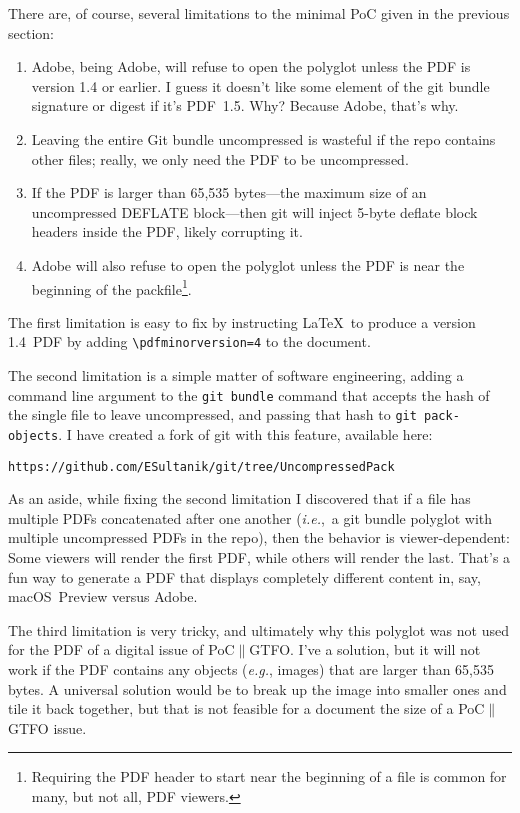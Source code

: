 \documentclass{article}
\begin{document}
There are, of course, several limitations to the minimal PoC given in
the previous section:
\begin{enumerate}

\item Adobe, being Adobe, will refuse to open the polyglot unless the PDF is version 1.4 or earlier.  I guess it doesn't like some element of the git bundle signature or digest if it's PDF~1.5. Why? Because Adobe, that's why.

\item Leaving the entire Git bundle uncompressed is wasteful if the repo contains other files; really, we only need the PDF to be uncompressed.

\item If the PDF is larger than 65,535 bytes---the maximum size of an uncompressed DEFLATE block---then git will inject 5-byte deflate block headers inside the PDF, likely corrupting it.

\item Adobe will also refuse to open the polyglot unless the PDF is near the beginning of the packfile\footnote{Requiring the PDF header to start near the beginning of a file is common for many, but not all, PDF viewers.}.

\end{enumerate}

The first limitation is easy to fix by instructing \LaTeX\ to produce
a version 1.4~PDF by adding \texttt{\textbackslash pdfminorversion=4}
to the document.

The second limitation is a simple matter of software engineering,
adding a command line argument to the \texttt{git bundle} command that
accepts the hash of the single file to leave uncompressed, and passing
that hash to \texttt{git pack-objects}. I have created a fork of git
with this feature, available here:
\begin{center}
  \texttt{https://github.com/ESultanik/git/tree/UncompressedPack}
\end{center}

As an aside, while fixing the second limitation I discovered that if a
file has multiple PDFs concatenated after one another
(\textit{i.e.},~a git bundle polyglot with multiple uncompressed PDFs
in the repo), then the behavior is viewer-dependent: Some viewers will
render the first PDF, while others will render the last.  That's a fun
way to generate a PDF that displays completely different content in,
say, macOS~Preview versus Adobe.

The third limitation is very tricky, and ultimately why this polyglot
was not used for the PDF of a digital issue of PoC$\|$GTFO. I've a
solution, but it will not work if the PDF contains any objects
(\textit{e.g.}, images) that are larger than 65,535 bytes. A universal
solution would be to break up the image into smaller ones and tile it
back together, but that is not feasible for a document the size of a
PoC$\|$GTFO issue.
\end{document}
